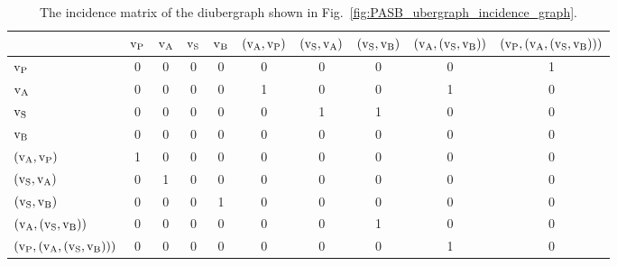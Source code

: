 \begin{table}[!htb]\label{tab:incidence_matrix_PASB}
    \caption{The incidence matrix of the diubergraph shown in Fig.~\ref{fig:PASB_ubergraph_incidence_graph}.}
\begin{tabular}{|l|ccccccccc|}
\hline
{} &  $\text{v}_\text{P}$ &  $\text{v}_\text{A}$ &  $\text{v}_\text{S}$ &  $\text{v}_\text{B}$ &  {\scriptsize $(\text{v}_\text{A},\text{v}_\text{P})$} &  {\scriptsize $(\text{v}_\text{S},\text{v}_\text{A})$} &  {\scriptsize $(\text{v}_\text{S},\text{v}_\text{B})$} &  {\scriptsize $(\text{v}_\text{A},(\text{v}_\text{S},\text{v}_\text{B}))$} &  {\scriptsize $(\text{v}_\text{P},(\text{v}_\text{A},(\text{v}_\text{S},\text{v}_\text{B})))$} \\
\hline
$\text{v}_\text{P}$             &  {\scriptsize 0} &  {\scriptsize 0} &  {\scriptsize 0} &  {\scriptsize 0} &      {\scriptsize 0} &      {\scriptsize 0} &      {\scriptsize 0} &          {\scriptsize 0} &              1 \\
$\text{v}_\text{A}$             &  {\scriptsize 0} &  {\scriptsize 0} &  {\scriptsize 0} &  {\scriptsize 0} &      1 &      {\scriptsize 0} &      {\scriptsize 0} &          1 &              {\scriptsize 0} \\
$\text{v}_\text{S}$             &  {\scriptsize 0} &  {\scriptsize 0} &  {\scriptsize 0} &  {\scriptsize 0} &      {\scriptsize 0} &      1 &      1 &          {\scriptsize 0} &              {\scriptsize 0} \\
$\text{v}_\text{B}$             &  {\scriptsize 0} &  {\scriptsize 0} &  {\scriptsize 0} &  {\scriptsize 0} &      {\scriptsize 0} &      {\scriptsize 0} &      {\scriptsize 0} &          {\scriptsize 0} &              {\scriptsize 0} \\
{\scriptsize $(\text{v}_\text{A},\text{v}_\text{P})$}         &  1 &  {\scriptsize 0} &  {\scriptsize 0} &  {\scriptsize 0} &      {\scriptsize 0} &      {\scriptsize 0} &      {\scriptsize 0} &          {\scriptsize 0} &              {\scriptsize 0} \\
{\scriptsize $(\text{v}_\text{S},\text{v}_\text{A})$}         &  {\scriptsize 0} &  1 &  {\scriptsize 0} &  {\scriptsize 0} &      {\scriptsize 0} &      {\scriptsize 0} &      {\scriptsize 0} &          {\scriptsize 0} &              {\scriptsize 0} \\
{\scriptsize $(\text{v}_\text{S},\text{v}_\text{B})$}         &  {\scriptsize 0} &  {\scriptsize 0} &  {\scriptsize 0} &  1 &      {\scriptsize 0} &      {\scriptsize 0} &      {\scriptsize 0} &          {\scriptsize 0} &              {\scriptsize 0} \\
{\scriptsize $(\text{v}_\text{A},(\text{v}_\text{S},\text{v}_\text{B}))$}     &  {\scriptsize 0} &  {\scriptsize 0} &  {\scriptsize 0} &  {\scriptsize 0} &      {\scriptsize 0} &      {\scriptsize 0} &      1 &          {\scriptsize 0} &              {\scriptsize 0} \\
{\scriptsize $(\text{v}_\text{P},(\text{v}_\text{A},(\text{v}_\text{S},\text{v}_\text{B})))$} &  {\scriptsize 0} &  {\scriptsize 0} &  {\scriptsize 0} &  {\scriptsize 0} &      {\scriptsize 0} &      {\scriptsize 0} &      {\scriptsize 0} &          1 &              {\scriptsize 0} \\
\hline
\end{tabular}
\end{table}

